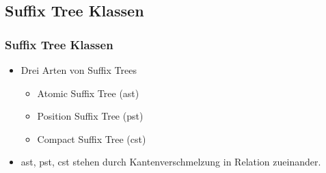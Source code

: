 \documentclass{beamer}
\begin{document}
\subsection{Suffix Tree Klassen}

\begin{frame}
\frametitle{Suffix Tree Klassen}
\begin{itemize}
    \item Drei Arten von Suffix Trees
    \begin{itemize}
        \item Atomic Suffix Tree (ast)
        \item Position Suffix Tree (pst)
        \item Compact Suffix Tree (cst)
    \end{itemize}
    \item ast, pst, cst stehen durch Kantenverschmelzung in Relation zueinander.
\end{itemize}
\end{frame}
\end{document}
